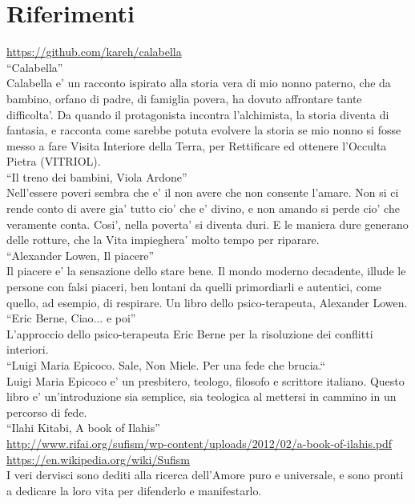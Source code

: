 \chapter{Riferimenti}
\label{chapRiferimenti}

  \url{https://github.com/kareh/calabella}\\
  ``Calabella''\\
  Calabella e' un racconto ispirato alla storia vera di mio nonno paterno, che da bambino, orfano di padre, di famiglia povera, ha dovuto affrontare tante difficolta'. Da quando il protagonista incontra l'alchimista, la storia diventa di fantasia, e racconta come sarebbe potuta evolvere la storia se mio nonno si fosse messo a fare Visita Interiore della Terra, per Rettificare ed ottenere l'Occulta Pietra (VITRIOL).\\

  ``Il treno dei bambini, Viola Ardone''\\
  Nell'essere poveri sembra che e' il non avere che non consente l'amare. Non si ci rende conto di avere gia' tutto cio' che e' divino, e non amando si perde cio' che veramente conta. Cosi', nella poverta' si diventa duri. E le maniera dure generano delle rotture, che la Vita impieghera' molto tempo per riparare. \\

  ``Alexander Lowen, Il piacere''\\
  Il piacere e' la sensazione dello stare bene. Il mondo moderno decadente, illude le persone
  con falsi piaceri, ben lontani da quelli primordiarli e autentici, come quello, ad esempio,
  di respirare. Un libro dello psico-terapeuta, Alexander Lowen.\\
  
  ``Eric Berne, Ciao... e poi''\\
  L'approccio dello psico-terapeuta Eric Berne per la risoluzione dei conflitti interiori.\\
  
  ``Luigi Maria Epicoco. Sale, Non Miele. Per una fede che brucia.``\\
  Luigi Maria Epicoco e' un presbitero, teologo, filosofo e scrittore italiano. Questo libro e' un'introduzione sia semplice, sia teologica al mettersi in cammino in un percorso di fede.\\

  ``Ilahi Kitabi, A book of Ilahis''\\
  \url{http://www.rifai.org/sufism/wp-content/uploads/2012/02/a-book-of-ilahis.pdf}\\
  \url{https://en.wikipedia.org/wiki/Sufism}\\
  I veri dervisci sono dediti alla ricerca dell'Amore puro e universale, e sono pronti a
  dedicare la loro vita per difenderlo e manifestarlo.\\

